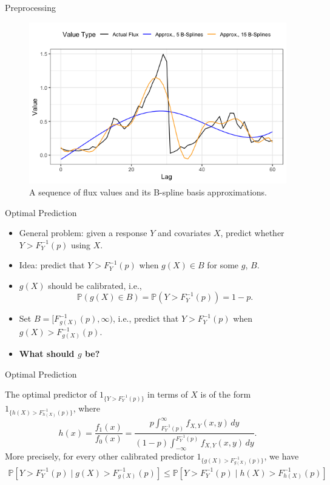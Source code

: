 \documentclass{beamer}
\def\P{\mathbb P}
\begin{document}
\begin{frame}{Preprocessing}
    \begin{figure}
        \centering
        \includegraphics[scale=0.5]{spline_plots.png}
        \caption{A sequence of flux values and its B-spline basis approximations.}
        \label{fig:spline_plots}
    \end{figure}
\end{frame}

\begin{frame}{Optimal Prediction}
    \begin{itemize}
    \item General problem: given a response $Y$ and covariates $X$, predict whether $Y > F_Y^{-1}(p)$ using $X$.
    \item Idea: predict that $Y > F_Y^{-1}(p)$ when $g(X) \in B$ for some $g$, $B$.
    \item $g(X)$ should be calibrated, i.e.,
    \[
    \P(g(X) \in B) = \P(Y > F_Y^{-1}(p)) = 1 - p.
    \]
    \item Set $B = [F_{g(X)}^{-1}(p), \infty)$, i.e., predict that $Y > F_Y^{-1}(p)$ when $g(X) > F_{g(X)}^{-1}(p)$.
    \item \textbf{What should $g$ be?}
    \end{itemize}
\end{frame}

\begin{frame}{Optimal Prediction}
    \begin{theorem} The optimal predictor of $1_{\{Y > F_Y^{-1}(p)\}}$ in terms of $X$ is of the form $1_{\{h(X) > F_{h(X)}^{-1}(p)\}}$, where
    \[
    h(x) = \frac{f_1(x)}{f_0(x)} = 
    \frac{p \int_{F_Y^{-1}(p)}^{\infty} f_{X, Y}(x, y)\,dy}{(1 - p)\int_{-\infty}^{F_Y^{-1}(p)} f_{X, Y}(x, y)\,dy}.
    \]
    More precisely, for every other calibrated predictor $1_{\{g(X) > F_{g(X)}^{-1}(p)\}}$, we have
    \begin{align*}
    \P[Y > F_Y^{-1}(p) \mid g(X) > F_{g(X)}^{-1}(p)] \le \P[Y > F_Y^{-1}(p) \mid h(X) > F_{h(X)}^{-1}(p)]
    \end{align*}
    \end{theorem}
\end{frame}
\end{document}

